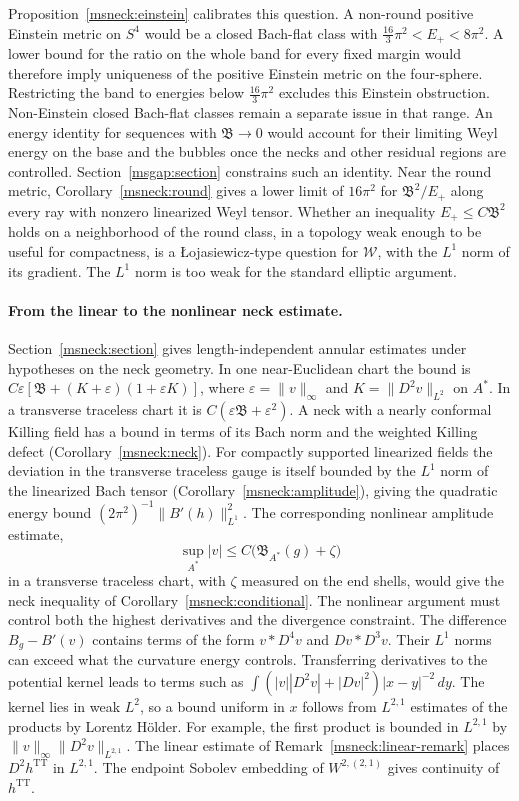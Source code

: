 \documentclass[11pt]{article}
\numberwithin{equation}{section}
\theoremstyle{definition}
\theoremstyle{remark}
\begin{document}
Proposition~\ref{msneck:einstein} calibrates this question. A non-round
positive Einstein metric on \(S^4\) would be a closed Bach-flat class
with \(\tfrac{16}3\pi^2<E_+<8\pi^2\). A lower bound for the ratio on the
whole band for every fixed margin would therefore imply uniqueness of
the positive Einstein metric on the four-sphere. Restricting the band
to energies below \(\tfrac{16}3\pi^2\) excludes this Einstein
obstruction. Non-Einstein closed Bach-flat classes remain a separate
issue in that range. An energy identity for sequences with
\(\mathfrak B\to0\) would account for their limiting Weyl energy on
the base and the bubbles once the necks and other residual regions
are controlled. Section~\ref{msgap:section} constrains such an identity.
Near the round metric, Corollary~\ref{msneck:round} gives a lower limit
of \(16\pi^2\) for \(\mathfrak B^2/E_+\) along every ray with nonzero
linearized Weyl tensor. Whether an inequality \(E_+\le C\mathfrak B^2\)
holds on a neighborhood of the round class, in a topology weak enough
to be useful for compactness, is a \L{}ojasiewicz-type question for
\(\mathcal W\), with the \(L^1\) norm of its gradient. The \(L^1\) norm is
too weak for the standard elliptic argument.

\paragraph{From the linear to the nonlinear neck estimate.}
Section~\ref{msneck:section} gives length-independent annular estimates
under hypotheses on the neck geometry. In one near-Euclidean chart the
bound is \(C\varepsilon[\mathfrak B+(K+\varepsilon)(1+\varepsilon K)]\),
where \(\varepsilon=\|v\|_\infty\) and \(K=\|D^2v\|_{L^2}\) on \(A^*\).
In a transverse traceless chart it is
\(C(\varepsilon\mathfrak B+\varepsilon^2)\).
A neck with a nearly conformal Killing field has a bound in terms of
its Bach norm and the weighted Killing defect
(Corollary~\ref{msneck:neck}). For compactly supported linearized
fields the deviation in the transverse traceless gauge is itself
bounded by the \(L^1\) norm of the linearized Bach tensor
(Corollary~\ref{msneck:amplitude}), giving the quadratic energy bound
\((2\pi^2)^{-1}\|B'(h)\|_{L^1}^2\). The corresponding nonlinear amplitude estimate,
\[
 \sup_{A^*}|v|\le C\bigl(\mathfrak B_{A^*}(g)+\zeta\bigr)
\]
in a transverse traceless chart, with \(\zeta\) measured on the end
shells, would give the neck inequality of
Corollary~\ref{msneck:conditional}. The nonlinear argument must
control both the highest derivatives and the divergence constraint.
The difference \(B_g-B'(v)\) contains terms of the form \(v\ast D^4v\)
and \(Dv\ast D^3v\). Their \(L^1\) norms can exceed what the curvature
energy controls. Transferring derivatives to the potential kernel
leads to terms such as
\(\int (|v||D^2v|+|Dv|^2)|x-y|^{-2}\,dy\).
The kernel lies in weak \(L^2\), so a bound uniform in \(x\) follows
from \(L^{2,1}\) estimates of the products by Lorentz H\"older.
For example, the first product is bounded in \(L^{2,1}\) by
\(\|v\|_\infty\|D^2v\|_{L^{2,1}}\). The linear estimate of
Remark~\ref{msneck:linear-remark} places \(D^2h^{\mathrm{TT}}\) in
\(L^{2,1}\). The endpoint Sobolev embedding of \(W^{2,(2,1)}\)
gives continuity of \(h^{\mathrm{TT}}\).
\end{document}
